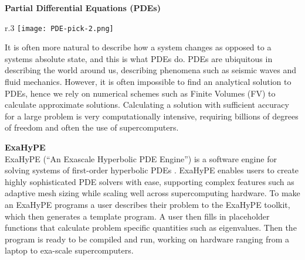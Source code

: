 \textbf{Partial Differential Equations (PDEs)}\\
\begin{wrapfigure}{r}{.3\textwidth}
        \texttt{[image: PDE-pick-2.png]}
\end{wrapfigure}
It is often more natural to describe how a system changes as opposed to a systems absolute state, and this is what PDEs do.
PDEs are ubiquitous in describing the world around us, describing 
phenomena such as seismic waves and fluid mechanics.
However, it is often impossible to find an analytical solution to PDEs, hence we rely 
on numerical schemes such as Finite Volumes (FV) to calculate approximate 
solutions.
Calculating a solution with sufficient accuracy for a large problem is very computationally intensive, requiring billions of degrees of freedom and often the use of supercomputers.

\phantom{ }

\textbf{ExaHyPE}\\
ExaHyPE (``An Exascale Hyperbolic PDE Engine'') is a software engine for solving systems of first-order hyperbolic PDEs \cite{exahype}.
ExaHyPE enables users to create highly sophisticated PDE solvers with ease, 
supporting complex features such as adaptive mesh sizing while scaling well across 
supercomputing hardware.
To make an ExaHyPE programs a user describes their problem to the ExaHyPE toolkit, which then generates a template program.
A user then fills in placeholder functions that calculate problem specific quantities such as eigenvalues.
Then the program is ready to be compiled and run, working on hardware ranging from a laptop to exa-scale supercomputers.




